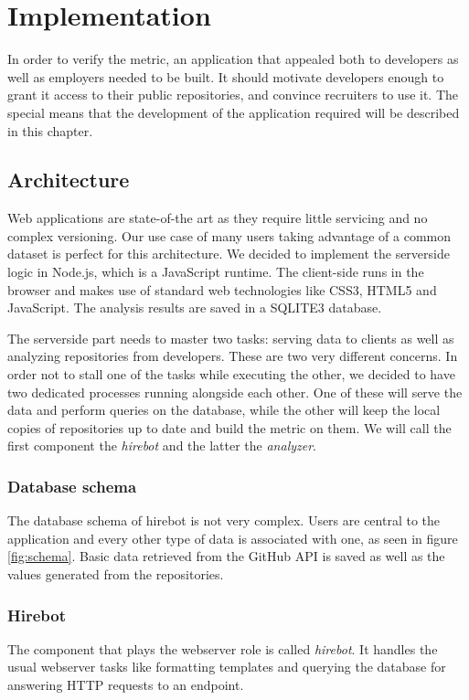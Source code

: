 \chapter{Implementation}\label{ch:implementation}
In order to verify the metric, an application that appealed both to developers as well as employers needed to be built. It should motivate developers enough to grant it access to their public repositories, and convince recruiters to use it. The special means that the development of the application required will be described in this chapter.

\section{Architecture}
Web applications are state-of-the art as they require little servicing and no complex versioning. Our use case of many users taking advantage of a common dataset is perfect for this architecture. We decided to implement the serverside logic in Node.js, which is a JavaScript runtime. The client-side runs in the browser and makes use of standard web technologies like CSS3, HTML5 and JavaScript. The analysis results are saved in a SQLITE3 database.
\newline

The serverside part needs to master two tasks: serving data to clients as well as analyzing repositories from developers. These are two very different concerns. In order not to stall one of the tasks while executing the other, we decided to have two dedicated processes running alongside each other. One of these will serve the data and perform queries on the database, while the other will keep the local copies of repositories up to date and build the metric on them. We will call the first component the \textit{hirebot} and the latter the \textit{analyzer}.

\subsection{Database schema}
The database schema of hirebot is not very complex. Users are central to the application and every other type of data is associated with one, as seen in figure \ref{fig:schema}. Basic data retrieved from the GitHub API is saved as well as the values generated from the repositories.

\subsection{Hirebot}
The component that plays the webserver role is called \textit{hirebot}. It handles the usual webserver tasks like formatting templates and querying the database for answering HTTP requests to an endpoint.
\newline

